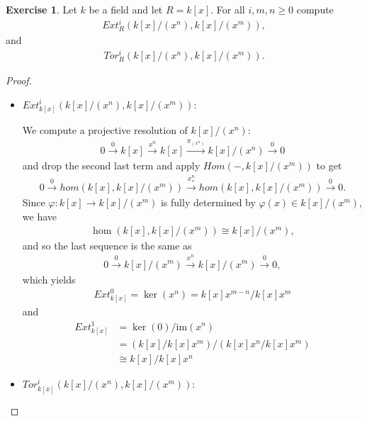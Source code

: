 \documentclass[12pt]{extarticle}
\newcommand{\im}{\text{im}}
\newcommand{\<}{\langle}
\renewcommand{\>}{\rangle}
\theoremstyle{definition}
\newtheorem{exercise}{Exercise}
\begin{document}
\begin{exercise}
  Let $k$ be a field and let $R = k[x]$. For all $i,m,n \geq 0$ compute
  \begin{align*}
    Ext_R^i(k[x]/(x^n), k[x]/(x^m)),
  \end{align*}
  and
  \begin{align*}
    Tor_R^i(k[x]/(x^n), k[x]/(x^m)).
  \end{align*}
\end{exercise}


\begin{proof}
  \begin{itemize}
  \item
    $Ext_{k[x]}^i(k[x]/(x^n), k[x]/(x^m))$:
    
    We compute a projective resolution of $k[x]/(x^n)$:
    \begin{align*}
      0 \xrightarrow{0} k[x] \xrightarrow{x^n} k[x] \xrightarrow{\pi_{(x^n)}} k[x]/(x^n) \xrightarrow{0} 0  
    \end{align*}
    and drop the second last term and apply $Hom(-, k[x]/(x^m))$ to get
    \begin{align*}
      0 \xrightarrow{0} hom(k[x],k[x]/(x^m)) \xrightarrow{x^n_*} hom(k[x], k[x]/(x^m)) \xrightarrow{0} 0.
    \end{align*}
    Since $\varphi: k[x] \to k[x]/(x^m)$ is fully determined by $\varphi(x) \in k[x]/(x^m)$, we have 
    \begin{align*}
      \hom(k[x],k[x]/(x^m)) \cong k[x]/(x^m),
    \end{align*}
    and so the last sequence is the same as
    \begin{align*}
      0 \xrightarrow{0} k[x]/(x^m) \xrightarrow{x^n} k[x]/(x^m) \xrightarrow{0} 0,
    \end{align*}
    which yields
    \begin{align*}
      Ext_{k[x]}^0 = \ker(x^n) = k[x]x^{m-n}/k[x]x^m
    \end{align*}
    and
    \begin{align*}
      Ext_{k[x]}^1 &= \ker(0)/\im(x^n) \\
      &= (k[x]/k[x]x^m)/(k[x]x^n/k[x]x^m) \\
      &\cong k[x]/k[x]x^n
    \end{align*}
  \item
    $Tor_{k[x]}^i(k[x]/(x^n), k[x]/(x^m)):$


\end{itemize}
\end{proof}
\end{document}
